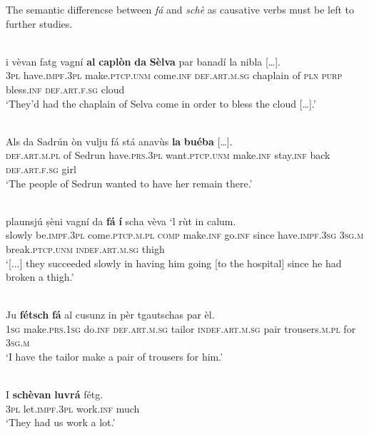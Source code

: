 The semantic differencse between \textit{fá} and \textit{schè} as causative verbs must be left to further studies.

\ea
\label{ex:causfa1}
 {\citealt[62]{Büchli1966}}\\
\gll    […] i vèvan fatg vagní \textbf{al} \textbf{caplòn} \textbf{da} \textbf{Sèlva} par banadí la nibla […].\\
{}   \textsc{3pl} have.\textsc{impf.3pl} make.\textsc{ptcp.unm} come.\textsc{inf} \textsc{def.art.m.sg} chaplain of \textsc{pln} \textsc{purp} bless.\textsc{inf} \textsc{def.art.f.sg} cloud\\
\glt `They’d had the chaplain of Selva come in order to bless the cloud […].'
\z

\ea
\label{ex:causfa2}
 {\citealt[131]{Büchli1966}}\\
\gll     Als da Sadrún òn vulju fá stá anavùs \textbf{la} \textbf{buéba} […].\\
\textsc{def.art.m.pl} of Sedrun have.\textsc{prs.3pl} want.\textsc{ptcp.unm} make.\textsc{inf} stay.\textsc{inf} back \textsc{def.art.f.sg} girl\\
\glt `The people of Sedrun wanted to have her remain there.'
\z


\ea\label{ex:causfa3}
\\
\gll   [...] plaunsjú ṣèni vagní da \textbf{fá} \textbf{í} scha vèva `l rùt in calum.\\
{} slowly be.\textsc{impf.3pl} come.\textsc{ptcp.m.pl} \textsc{comp} make.\textsc{inf} go.\textsc{inf} since have.\textsc{impf.3sg} \textsc{3sg.m} break.\textsc{ptcp.unm} \textsc{indef.art.m.sg} thigh \\
\glt `[...] they succeeded slowly in having him going [to the hospital] since he had broken a thigh.'
\z

\ea
\label{ex:causfa4}
\\
\gll Ju \textbf{fétsch} \textbf{fá} al cusunz in pèr tgautschas par èl.\\
\textsc{1sg} make.\textsc{prs.1sg} do.\textsc{inf} \textsc{def.art.m.sg} tailor \textsc{indef.art.m.sg} pair trousers.\textsc{m.pl} for \textsc{3sg.m}\\
\glt `I have the tailor make a pair of trousers for him.'
\z

\ea
\label{ex:causscha1}
\\
\gll I \textbf{schèvan} \textbf{luvrá} fétg.\\
\textsc{3pl} let.\textsc{impf.3pl} work.\textsc{inf} much\\
\glt `They had us work a lot.'
\z

